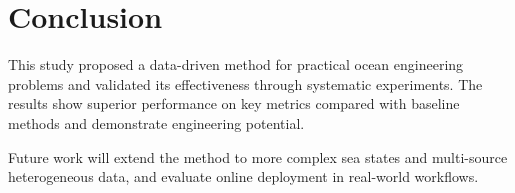 \section{Conclusion}

This study proposed a data-driven method for practical ocean engineering problems and validated its effectiveness through systematic experiments. The results show superior performance on key metrics compared with baseline methods and demonstrate engineering potential.

Future work will extend the method to more complex sea states and multi-source heterogeneous data, and evaluate online deployment in real-world workflows.
